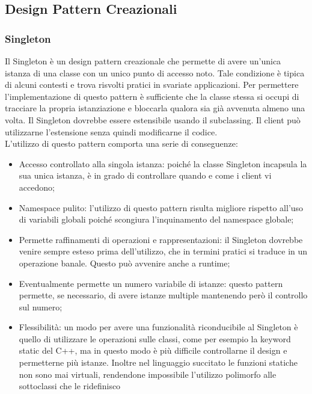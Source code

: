 \documentclass[12pt,a4paper]{article}
\begin{document}
\subsection{Design Pattern Creazionali}
\subsubsection{Singleton}
Il Singleton è un design pattern creazionale che permette di avere un’unica istanza di una classe con un unico punto di accesso noto. Tale condizione è tipica di alcuni contesti e trova risvolti pratici in svariate applicazioni. Per permettere l’implementazione di questo pattern è sufficiente che la classe stessa si occupi di tracciare la propria istanziazione e bloccarla qualora sia già avvenuta almeno una volta. Il Singleton dovrebbe essere estensibile usando il subclassing. Il client può utilizzarne l’estensione senza quindi modificarne il codice.\\
L’utilizzo di questo pattern comporta una serie di conseguenze:
\begin{itemize}
	\item Accesso controllato alla singola istanza: poiché la classe Singleton incapsula la sua unica istanza, è in grado di controllare quando e come i client vi accedono;
	\item Namespace pulito: l’utilizzo di questo pattern risulta migliore rispetto all’uso di variabili globali poiché scongiura l’inquinamento del namespace globale;
	\item Permette raffinamenti di operazioni e rappresentazioni: il Singleton dovrebbe venire sempre esteso prima dell’utilizzo, che in termini pratici si traduce in un operazione banale. Questo può avvenire anche a runtime;
	\item Eventualmente permette un numero variabile di istanze: questo pattern permette, se necessario, di avere istanze multiple mantenendo però il controllo sul numero;
	\item Flessibilità: un modo per avere una funzionalità riconducibile al Singleton è quello di utilizzare le operazioni sulle classi, come per esempio la keyword static del C++, ma in questo modo è più difficile controllarne il design e permetterne più istanze. Inoltre nel linguaggio succitato le funzioni statiche non sono mai virtuali, rendendone impossibile l’utilizzo polimorfo alle sottoclassi che le ridefinisco
\end{itemize}

\end{document}
